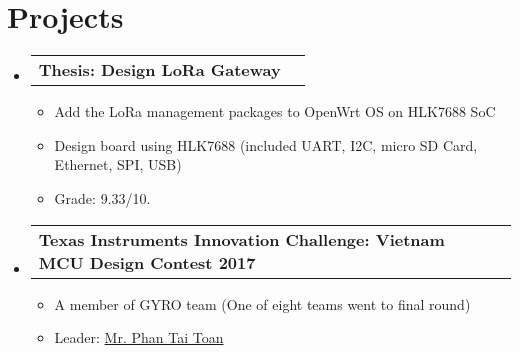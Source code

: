 \documentclass[letterpaper,11pt]{article}
\makeatletter
\newcommand{\resumeItem}[1]{
  \item\small{
    {#1 \vspace{-2pt}}
  }
}
\newcommand{\resumeProjectHeading}[2]{
    \vspace{-2pt}\item
    \begin{tabular*}{0.97\textwidth}{l@{\extracolsep{\fill}}r}
      \small#1 & #2 \\
    \end{tabular*}\vspace{-7pt}
}
\newcommand{\resumeSubHeadingListStart}{\begin{itemize}[leftmargin=0.15in, label={}]}
\newcommand{\resumeSubHeadingListEnd}{\end{itemize}}
\newcommand{\resumeItemListStart}{\begin{itemize}}
\newcommand{\resumeItemListEnd}{\end{itemize}\vspace{-5pt}}
\makeatother
\begin{document}
\section{Projects}
    \vspace{3pt}
    \resumeSubHeadingListStart
      
      \resumeProjectHeading
        {\textbf{Thesis: Design LoRa Gateway}}{}
          \resumeItemListStart
            \resumeItem{Add the LoRa management packages to OpenWrt OS on HLK7688 SoC}
            \resumeItem{Design board using HLK7688 (included UART, I2C, micro SD Card, Ethernet, SPI, USB)}
            \resumeItem{Grade: 9.33/10.}
          \resumeItemListEnd
      
      \resumeProjectHeading
        {\textbf{Texas Instruments Innovation Challenge: Vietnam MCU Design Contest 2017}}{}
          \resumeItemListStart
            \resumeItem{A member of GYRO team (One of eight teams went to final round)}
            \resumeItem{Leader: \href{https://www.linkedin.com/in/toan-phan-amimeche-9569ba117/}{\color{blue}Mr. Phan Tai Toan}}
          \resumeItemListEnd

    \resumeSubHeadingListEnd




        
\end{document}
